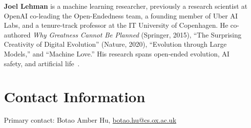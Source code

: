 \documentclass[letterpaper]{article}
\begin{document}
\textbf{Joel Lehman} is a machine learning researcher, previously a research scientist at OpenAI co-leading the Open-Endedness team, a founding member of Uber AI Labs, and a tenure-track professor at the IT University of Copenhagen. He co-authored \emph{Why Greatness Cannot Be Planned} (Springer, 2015), ``The Surprising Creativity of Digital Evolution'' (Nature, 2020), ``Evolution through Large Models,'' and ``Machine Love.'' His research spans open-ended evolution, AI safety, and artificial life~\citep{lehman2023machine}.

\section{Contact Information}
Primary contact: Botao Amber Hu, \href{mailto:botao.hu@cs.ox.ac.uk}{botao.hu@cs.ox.ac.uk}

\footnotesize


\end{document}
